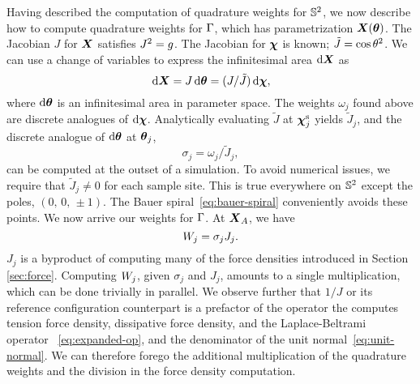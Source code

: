 Having described the computation of quadrature weights for $\mathbb{S}^2$, we now
describe how to compute quadrature weights for $\Gamma$, which has parametrization
$\boldsymbol{X}(\boldsymbol{\theta})$. The Jacobian $J$ for $\boldsymbol{X}$ satisfies
$J^2 = g$. The Jacobian for $\boldsymbol{\chi}$ is known; $\tilde{J} = \cos\q[2]$. We can use a
change of variables to express the infinitesimal area $\d\X$ as
\begin{equation}\label{eq:quad-cov}
    \d\X
    = J\d\qs
    = (J/\tilde{J})\d\Xp,
\end{equation}
where $\d\qs$ is an infinitesimal area in parameter space. The weights $\omega_j$ found
above are discrete analogues of $\d\Xp$. Analytically evaluating $\tilde{J}$ at
${\boldsymbol{\chi}}^\text{s}_j$ yields $\tilde{J}_j$, and the discrete analogue of $\d\qs$ at $\boldsymbol{\theta}_j$,
\begin{equation*}
    \sigma_j=\omega_j/\tilde{J}_j,
\end{equation*}
can be computed at the outset of a simulation. To avoid numerical issues, we require that
$\tilde{J}_j \neq 0$ for each sample site. This is true everywhere on $\mathbb{S}^2$ except
the poles, $(0,\,0,\,\pm1)$. The Bauer spiral~\eqref{eq:bauer-spiral} conveniently avoids
these points. We now arrive our weights for $\Gamma$. At $\boldsymbol{X}_A$, we have
\begin{equation}
    \weight[j] = \sigma_j J_j.
\end{equation}
$J_j$ is a byproduct of computing many of the force densities introduced in Section~%
\ref{sec:force}. Computing $\weight[j]$, given $\sigma_j$ and $J_j$, amounts to a single
multiplication, which can be done trivially in parallel. We observe further that $1/J$
or its reference configuration counterpart is a prefactor of the operator the computes
tension force density, dissipative force density, and the Laplace-Beltrami operator~%
\eqref{eq:expanded-op}, and the denominator of the unit normal~\eqref{eq:unit-normal}. We
can therefore forego the additional multiplication of the quadrature weights and the
division in the force density computation.

